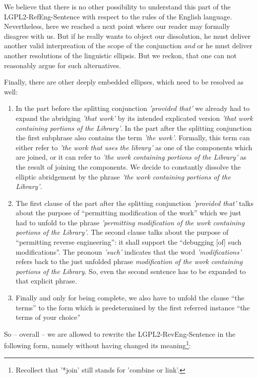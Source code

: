We believe that there is no other possibility to understand this part of the
LGPL2-RefEng-Sentence with respect to the rules of the English language.
Nevertheless, here we reached a next point where our reader may formally
disagree with us. But if he really wants to object our dissolution, he must
deliver another valid interpreation of the scope of the conjunction \emph{and}
or he must deliver another resolutions of the linguistic ellipsis. But we
reckon, that one can not reasonably argue for such alternatives.

Finally, there are other deeply embedded ellipses, which need to be resolved
as well:

\begin{enumerate}
  \item  In the part before the splitting conjunction \emph{'provided that'} we
  already had to expand the abridging \emph{'that work'} by its intended
  explicated version \emph{'that work containing portions of the Library'}.  In
  the part after the splitting conjunction the first subphrase also contains the
  term \emph{'the work'}. Formally, this term can either refer to \emph{'the
  work that uses the library'} as one of the components which are joined, or it
  can refer to \emph{'the work containing portions of the Library'} as the
  result of joining the components. We decide to constantly dissolve the
  elliptic abridgement by the phrase \emph{'the work containing portions of the
  Library'}.
  \item The first clause of the part after the splitting conjunction
  \emph{'provided that'} talks about the purpose of \enquote{permitting
  modification of the work} which we just had to unfold to the phrase
  \emph{'permitting modification of the work containing portions of the
  Library'}. The second clause talks about the purpose of \enquote{permitting
  reverse engineering}: it shall support the \enquote{debugging [of] such
  modifications}. The pronoun \emph{'such'} indicates that the word
  \emph{'modifications'} refers back to the just unfolded phrase
  \emph{modification of the work containing portions of the Library}. So, even
  the second sentence has to be expanded to that explicit phrase.
  \item Finally and only for being complete, we also have to unfold the clause
  \enquote{the terms} to the form which is predetermined by the first referred
  instance \enquote{the terms of your choice}
\end{enumerate}

So -- overall -- we are allowed to rewrite the LGPL2-RevEng-Sentence 
in the following form, namely without having changed its
meaning\footnote{Recollect that '*join' still stands for 'combine or link'.}:

